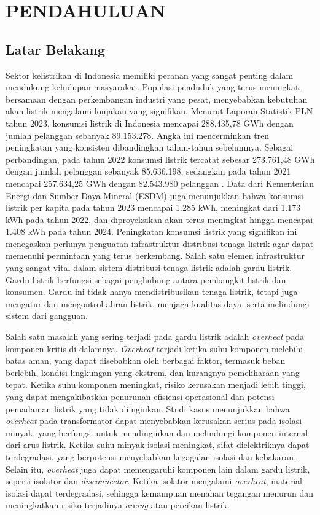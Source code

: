 \chapter{PENDAHULUAN}

\section{Latar Belakang}
\sloppy
Sektor kelistrikan di Indonesia memiliki peranan yang sangat penting dalam mendukung kehidupan masyarakat. Populasi penduduk yang terus meningkat, bersamaan dengan perkembangan industri yang pesat, menyebabkan kebutuhan akan listrik mengalami lonjakan yang signifikan. Menurut Laporan Statistik PLN tahun 2023, konsumsi listrik di Indonesia mencapai 288.435,78 GWh dengan jumlah pelanggan sebanyak 89.153.278. Angka ini mencerminkan tren peningkatan yang konsisten dibandingkan tahun-tahun sebelumnya. Sebagai perbandingan, pada tahun 2022 konsumsi listrik tercatat sebesar 273.761,48 GWh dengan jumlah pelanggan sebanyak 85.636.198, sedangkan pada tahun 2021 mencapai 257.634,25 GWh dengan 82.543.980 pelanggan \cite{PLN2023}. Data dari Kementerian Energi dan Sumber Daya Mineral (ESDM) juga menunjukkan bahwa konsumsi listrik per kapita pada tahun 2023 mencapai 1.285 kWh, meningkat dari 1.173 kWh pada tahun 2022, dan diproyeksikan akan terus meningkat hingga mencapai 1.408 kWh pada tahun 2024\cite{ESDM2024}. Peningkatan konsumsi listrik yang signifikan ini menegaskan perlunya penguatan infrastruktur distribusi tenaga listrik agar dapat memenuhi permintaan yang terus berkembang. Salah satu elemen infrastruktur yang sangat vital dalam sistem distribusi tenaga listrik adalah gardu listrik. Gardu listrik berfungsi sebagai penghubung antara pembangkit listrik dan konsumen. Gardu ini tidak hanya mendistribusikan tenaga listrik, tetapi juga mengatur dan mengontrol aliran listrik, menjaga kualitas daya, serta melindungi sistem dari gangguan.

Salah satu masalah yang sering terjadi pada gardu listrik adalah \emph{overheat} pada komponen kritis di dalamnya. \emph{Overheat} terjadi ketika suhu komponen melebihi batas aman, yang dapat disebabkan oleh berbagai faktor, termasuk beban berlebih, kondisi lingkungan yang ekstrem, dan kurangnya pemeliharaan yang tepat\cite{Bailey2022}. Ketika suhu komponen meningkat, risiko kerusakan menjadi lebih tinggi, yang dapat mengakibatkan penurunan efisiensi operasional dan potensi pemadaman listrik yang tidak diinginkan\cite{Aksenovich2022}. Studi kasus menunjukkan bahwa \emph{overheat} pada transformator dapat menyebabkan kerusakan serius pada isolasi minyak, yang berfungsi untuk mendinginkan dan melindungi komponen internal dari arus listrik. Ketika suhu minyak isolasi meningkat, sifat dielektriknya dapat terdegradasi, yang berpotensi menyebabkan kegagalan isolasi dan kebakaran\cite{Kalathiripi2017}. Selain itu, \emph{overheat} juga dapat memengaruhi komponen lain dalam gardu listrik, seperti isolator dan \emph{disconnector}. Ketika isolator mengalami \emph{overheat}, material isolasi dapat terdegradasi, sehingga kemampuan menahan tegangan menurun dan meningkatkan risiko terjadinya \emph{arcing} atau percikan listrik\cite{Li2017}.

